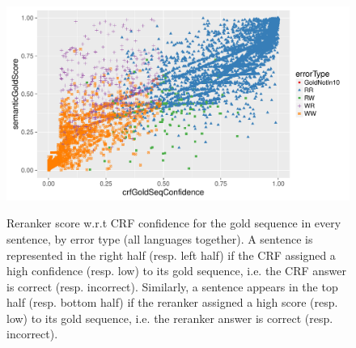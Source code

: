 \documentclass[output=paper
,modfonts
,nonflat]{langsci/langscibook}
\begin{document}
\begin{figure}
  \centering
      {\includegraphics[scale=0.47]{figures/graph-points-gold-confidence-vs-score-by-error-type.pdf}}
      {\caption{{ Reranker score w.r.t CRF confidence for the gold
            sequence in every sentence, by error type (all languages
            together).} A sentence is represented in the right half
          (resp. left half) if the CRF assigned a high confidence
          (resp. low) to its gold sequence, i.e. the CRF answer is
          correct (resp. incorrect). Similarly, a sentence appears in
          the top half (resp. bottom half) if the reranker assigned a
          high score (resp. low) to its gold sequence, i.e. the
          reranker answer is correct
          (resp. incorrect).\protect\footnotemark
        }\label{fig:goldConfidenceVsScoreByError}}
\end{figure}


\end{document}
